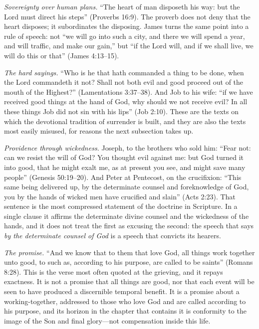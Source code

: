 \emph{Sovereignty over human plans.} ``The heart of man disposeth his way: but the Lord must direct his steps'' (Proverbs 16:9). The proverb does not deny that the heart disposes; it subordinates the disposing. James turns the same point into a rule of speech: not ``we will go into such a city, and there we will spend a year, and will traffic, and make our gain,'' but ``if the Lord will, and if we shall live, we will do this or that'' (James 4:13--15).

\emph{The hard sayings.} ``Who is he that hath commanded a thing to be done, when the Lord commandeth it not? Shall not both evil and good proceed out of the mouth of the Highest?'' (Lamentations 3:37--38). And Job to his wife: ``if we have received good things at the hand of God, why should we not receive evil? In all these things Job did not sin with his lips'' (Job 2:10). These are the texts on which the devotional tradition of surrender is built, and they are also the texts most easily misused, for reasons the next subsection takes up.

\emph{Providence through wickedness.} Joseph, to the brothers who sold him: ``Fear not: can we resist the will of God? You thought evil against me: but God turned it into good, that he might exalt me, as at present you see, and might save many people'' (Genesis 50:19--20). And Peter at Pentecost, on the crucifixion: ``This same being delivered up, by the determinate counsel and foreknowledge of God, you by the hands of wicked men have crucified and slain'' (Acts 2:23). That sentence is the most compressed statement of the doctrine in Scripture. In a single clause it affirms the determinate divine counsel and the wickedness of the hands, and it does not treat the first as excusing the second: the speech that says \emph{by the determinate counsel of God} is a speech that convicts its hearers.

\emph{The promise.} ``And we know that to them that love God, all things work together unto good, to such as, according to his purpose, are called to be saints'' (Romans 8:28). This is the verse most often quoted at the grieving, and it repays exactness. It is not a promise that all things are good, nor that each event will be seen to have produced a discernible temporal benefit. It is a promise about a working-together, addressed to those who love God and are called according to his purpose, and its horizon in the chapter that contains it is conformity to the image of the Son and final glory---not compensation inside this life.

